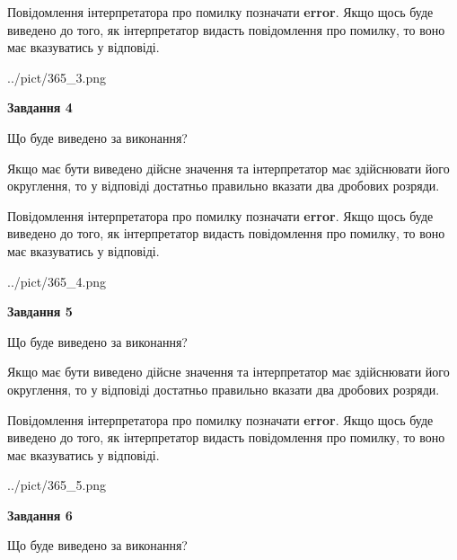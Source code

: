 \documentclass[12pt, ukrainian]{article}
\begin{document}
{\begin {Large}
Повідомлення інтерпретатора про помилку позначати \textbf{error}.
Якщо щось буде виведено до того, як інтерпретатор видасть повідомлення про помилку, 
то воно має вказуватись у відповіді. \par

\begin{center}
	{../pict/365_3.png}
\end{center}
\newpage

{\begin {center}\textbf{Завдання 4}\end {center}}\par
Що буде виведено за виконання? \par

Якщо має бути виведено дійсне значення та інтерпретатор має здійснювати його округлення, 
то у відповіді достатньо правильно вказати два дробових розряди.

Повідомлення інтерпретатора про помилку позначати \textbf{error}.
Якщо щось буде виведено до того, як інтерпретатор видасть повідомлення про помилку, 
то воно має вказуватись у відповіді. \par

\begin{center}
	{../pict/365_4.png}
\end{center}
\newpage

{\begin {center}\textbf{Завдання 5}\end {center}}\par
Що буде виведено за виконання? \par

Якщо має бути виведено дійсне значення та інтерпретатор має здійснювати його округлення, 
то у відповіді достатньо правильно вказати два дробових розряди.

Повідомлення інтерпретатора про помилку позначати \textbf{error}.
Якщо щось буде виведено до того, як інтерпретатор видасть повідомлення про помилку, 
то воно має вказуватись у відповіді. \par

\begin{center}
	{../pict/365_5.png}
\end{center}
\newpage

{\begin {center}\textbf{Завдання 6}\end {center}}\par
Що буде виведено за виконання? \par


\end{Large}}
\end{document}
